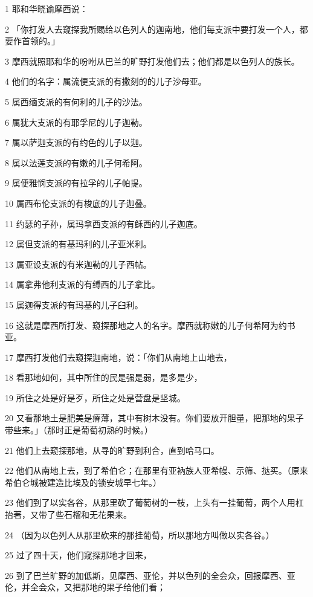 \par 1 耶和华晓谕摩西说：
\par 2 「你打发人去窥探我所赐给以色列人的迦南地，他们每支派中要打发一个人，都要作首领的。」
\par 3 摩西就照耶和华的吩咐从巴兰的旷野打发他们去；他们都是以色列人的族长。
\par 4 他们的名字：属流便支派的有撒刻的的儿子沙母亚。
\par 5 属西缅支派的有何利的儿子的沙法。
\par 6 属犹大支派的有耶孚尼的儿子迦勒。
\par 7 属以萨迦支派的有约色的儿子以迦。
\par 8 属以法莲支派的有嫩的儿子何希阿。
\par 9 属便雅悯支派的有拉孚的儿子帕提。
\par 10 属西布伦支派的有梭底的儿子迦叠。
\par 11 约瑟的子孙，属玛拿西支派的有稣西的儿子迦底。
\par 12 属但支派的有基玛利的儿子亚米利。
\par 13 属亚设支派的有米迦勒的儿子西帖。
\par 14 属拿弗他利支派的有缚西的儿子拿比。
\par 15 属迦得支派的有玛基的儿子臼利。
\par 16 这就是摩西所打发、窥探那地之人的名字。摩西就称嫩的儿子何希阿为约书亚。
\par 17 摩西打发他们去窥探迦南地，说：「你们从南地上山地去，
\par 18 看那地如何，其中所住的民是强是弱，是多是少，
\par 19 所住之处是好是歹，所住之处是营盘是坚城。
\par 20 又看那地土是肥美是瘠薄，其中有树木没有。你们要放开胆量，把那地的果子带些来。」（那时正是葡萄初熟的时候。）
\par 21 他们上去窥探那地，从寻的旷野到利合，直到哈马口。
\par 22 他们从南地上去，到了希伯仑；在那里有亚衲族人亚希幔、示筛、挞买。（原来希伯仑城被建造比埃及的锁安城早七年。）
\par 23 他们到了以实各谷，从那里砍了葡萄树的一枝，上头有一挂葡萄，两个人用杠抬著，又带了些石榴和无花果来。
\par 24 （因为以色列人从那里砍来的那挂葡萄，所以那地方叫做以实各谷。）
\par 25 过了四十天，他们窥探那地才回来，
\par 26 到了巴兰旷野的加低斯，见摩西、亚伦，并以色列的全会众，回报摩西、亚伦，并全会众，又把那地的果子给他们看；
